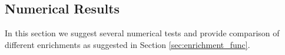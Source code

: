 
\subsection{Numerical Results}
\label{sec:results}

In this section we suggest several numerical tests and provide comparison of different enrichments
as suggested in Section \ref{sec:enrichment_func}.

